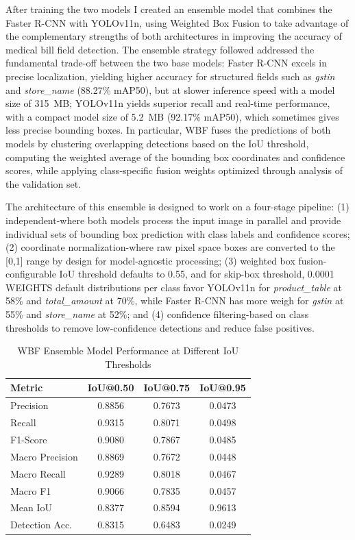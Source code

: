 \documentclass[conference,twocolumn]{IEEEtran}
\begin{document}
After training the two models I created an ensemble model that combines
the Faster R-CNN with YOLOv11n, using Weighted Box Fusion to take
advantage of the complementary strengths of both architectures in
improving the accuracy of medical bill field detection. The ensemble
strategy followed addressed the fundamental trade-off between the two
base models: Faster R-CNN excels in precise localization, yielding
higher accuracy for structured fields such as \textit{gstin} and
\textit{store\_name} (88.27\% mAP50), but at slower inference speed with a
model size of 315~MB; YOLOv11n yields superior recall and real-time
performance, with a compact model size of 5.2~MB (92.17\% mAP50), which
sometimes gives less precise bounding boxes. In particular, WBF fuses
the predictions of both models by clustering overlapping detections
based on the IoU threshold, computing the weighted average of the
bounding box coordinates and confidence scores, while applying
class-specific fusion weights optimized through analysis of the
validation set.

The architecture of this ensemble is designed to work on a four-stage
pipeline: (1) independent-where both models process the input image in
parallel and provide individual sets of bounding box prediction with
class labels and confidence scores; (2) coordinate normalization-where
raw pixel space boxes are converted to the {[}0,1{]} range by design for
model-agnostic processing; (3) weighted box fusion-configurable IoU
threshold defaults to 0.55, and for skip-box threshold, 0.0001 WEIGHTS
default distributions per class favor YOLOv11n for \textit{product\_table}
at 58\% and \textit{total\_amount} at 70\%, while Faster R-CNN has more
weigh for \textit{gstin} at 55\% and \textit{store\_name} at 52\%; and (4)
confidence filtering-based on class thresholds to remove low-confidence
detections and reduce false positives.

\begin{table}[htbp]
\caption{WBF Ensemble Model Performance at Different IoU Thresholds}
\label{tab:wbf}
\centering
\footnotesize
\begin{tabular}{lccc}
\toprule
Metric & IoU@0.50 & IoU@0.75 & IoU@0.95 \\
\midrule
Precision & 0.8856 & 0.7673 & 0.0473 \\
Recall & 0.9315 & 0.8071 & 0.0498 \\
F1-Score & 0.9080 & 0.7867 & 0.0485 \\
Macro Precision & 0.8869 & 0.7672 & 0.0448 \\
Macro Recall & 0.9289 & 0.8018 & 0.0467 \\
Macro F1 & 0.9066 & 0.7835 & 0.0457 \\
Mean IoU & 0.8377 & 0.8594 & 0.9613 \\
Detection Acc. & 0.8315 & 0.6483 & 0.0249 \\
\bottomrule
\end{tabular}
\end{table}
\end{document}
